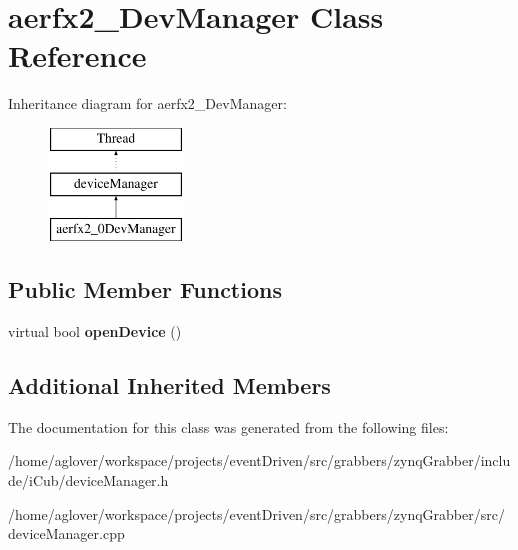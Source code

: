 \hypertarget{classaerfx2__0DevManager}{\section{aerfx2\-\_\-Dev\-Manager Class Reference}
\label{classaerfx2__0DevManager}
}
Inheritance diagram for aerfx2\-\_\-Dev\-Manager\-:\begin{figure}[H]
\begin{center}
\leavevmode
\includegraphics[height=3.000000cm]{classaerfx2__0DevManager}
\end{center}
\end{figure}
\subsection*{Public Member Functions}
\begin{DoxyCompactItemize}
\item 
\hypertarget{classaerfx2__0DevManager_a93dd53b43522a48a10d87bd1e86fed6c}{virtual bool {\bfseries open\-Device} ()}\label{classaerfx2__0DevManager_a93dd53b43522a48a10d87bd1e86fed6c}

\end{DoxyCompactItemize}
\subsection*{Additional Inherited Members}


The documentation for this class was generated from the following files\-:\begin{DoxyCompactItemize}
\item 
/home/aglover/workspace/projects/event\-Driven/src/grabbers/zynq\-Grabber/include/i\-Cub/device\-Manager.\-h\item 
/home/aglover/workspace/projects/event\-Driven/src/grabbers/zynq\-Grabber/src/device\-Manager.\-cpp\end{DoxyCompactItemize}

